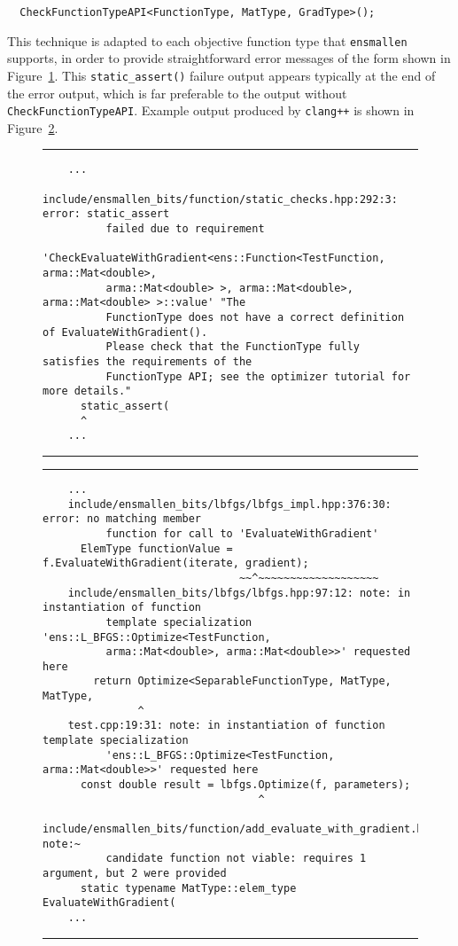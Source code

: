 \begin{verbatim}
  CheckFunctionTypeAPI<FunctionType, MatType, GradType>();
\end{verbatim}

This technique is adapted to each objective function type that {\tt ensmallen}
supports, in order to provide straightforward error messages of the form shown in Figure~\ref{fig:example_error_message_1}.
This {\tt static\_assert()} failure output appears typically at the end of the
error output, which is far preferable to the output without {\tt
CheckFunctionTypeAPI}.  Example output produced by {\tt clang++} is shown in
Figure~\ref{fig:example_error_message_2}.

\begin{figure}[!tb]
\hrule
\vspace{1ex}
\begin{verbatim}
    ...
    include/ensmallen_bits/function/static_checks.hpp:292:3: error: static_assert
          failed due to requirement
          'CheckEvaluateWithGradient<ens::Function<TestFunction, arma::Mat<double>,
          arma::Mat<double> >, arma::Mat<double>, arma::Mat<double> >::value' "The
          FunctionType does not have a correct definition of EvaluateWithGradient().
          Please check that the FunctionType fully satisfies the requirements of the
          FunctionType API; see the optimizer tutorial for more details."
      static_assert(
      ^
    ...
\end{verbatim}
\hrule
\caption{}
\label{fig:example_error_message_1}
\end{figure}

\begin{figure}[!tb]
\hrule
\vspace{1ex}
\begin{verbatim}
    ...
    include/ensmallen_bits/lbfgs/lbfgs_impl.hpp:376:30: error: no matching member
          function for call to 'EvaluateWithGradient'
      ElemType functionValue = f.EvaluateWithGradient(iterate, gradient);
                               ~~^~~~~~~~~~~~~~~~~~~~
    include/ensmallen_bits/lbfgs/lbfgs.hpp:97:12: note: in instantiation of function
          template specialization 'ens::L_BFGS::Optimize<TestFunction,
          arma::Mat<double>, arma::Mat<double>>' requested here
        return Optimize<SeparableFunctionType, MatType, MatType,
               ^
    test.cpp:19:31: note: in instantiation of function template specialization
          'ens::L_BFGS::Optimize<TestFunction, arma::Mat<double>>' requested here
      const double result = lbfgs.Optimize(f, parameters);
                                  ^
    include/ensmallen_bits/function/add_evaluate_with_gradient.hpp:225:38: note:~
          candidate function not viable: requires 1 argument, but 2 were provided
      static typename MatType::elem_type EvaluateWithGradient(
    ...
\end{verbatim}
\hrule
\caption{}
\label{fig:example_error_message_2}
\end{figure}


